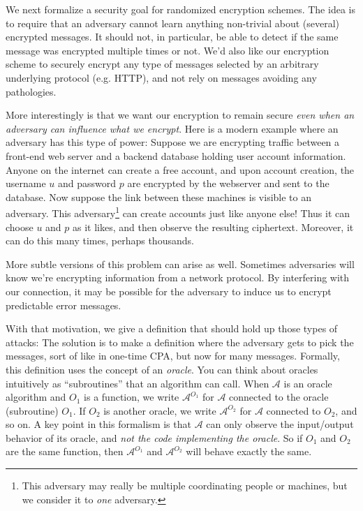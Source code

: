 \documentclass[11pt]{article}
\newcommand{\calA}{\mathcal{A}}
\begin{document}
We next formalize a security goal for randomized encryption schemes. The idea
is to require that an adversary cannot learn anything non-trivial about
(several) encrypted messages. It should not, in particular, be able to detect
if the same message was encrypted multiple times or not. We'd also like our
encryption scheme to securely encrypt any type of messages selected by an
arbitrary underlying protocol (e.g. HTTP), and not rely on messages avoiding
any pathologies.

More interestingly is that we want our encryption to remain secure \emph{even
when an adversary can influence what we encrypt}. Here is a modern example
where an adversary has this type of power: Suppose we are encrypting traffic
between a front-end web server and a backend database holding user account
information. Anyone on the internet can create a free account, and upon account
creation, the username $u$ and password $p$ are encrypted by the webserver and
sent to the database. Now suppose the link between these machines is visible to
an adversary. This adversary\footnote{This adversary may really be multiple
coordinating people or machines, but we consider it to \emph{one} adversary.}
can create accounts just like anyone else! Thus it can choose $u$ and $p$ as it
likes, and then observe the resulting ciphertext. Moreover, it can do this many
times, perhaps thousands.

More subtle versions of this problem can arise as well. Sometimes adversaries
will know we're encrypting information from a network protocol. By interfering
with our connection, it may be possible for the adversary to induce us to
encrypt predictable error messages.

With that motivation, we give a definition that should hold up those types
of attacks: The solution is to make a definition where the adversary gets
to pick the messages, sort of like in one-time CPA, but now for many
messages. Formally, this definition uses the concept of an \emph{oracle}.
You can think about oracles intuitively as ``subroutines'' that an
algorithm can call. When $\calA$ is an oracle algorithm and $O_1$ is a
function, we write $\calA^{O_1}$ for $\calA$ connected to the oracle
(subroutine) $O_1$. If $O_2$ is another oracle, we write $\calA^{O_2}$ for
$\calA$ connected to $O_2$, and so on.  A key point in this formalism is that
$\calA$ can only observe the input/output behavior of its oracle, and \emph{not
the code implementing the oracle}.  So if $O_1$ and $O_2$ are the same
function, then $\calA^{O_1}$ and $\calA^{O_2}$ will behave exactly the same. 
\end{document}
